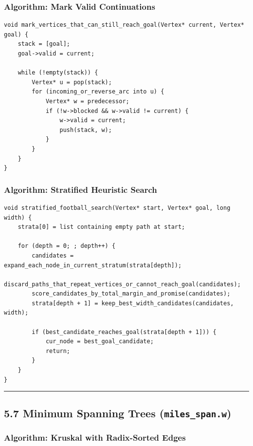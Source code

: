 \documentclass[11pt]{article}
\begin{document}
\subsubsection{Algorithm: Mark Valid Continuations}\label{algorithm-mark-valid-continuations}

\begin{verbatim}
void mark_vertices_that_can_still_reach_goal(Vertex* current, Vertex* goal) {
    stack = [goal];
    goal->valid = current;

    while (!empty(stack)) {
        Vertex* u = pop(stack);
        for (incoming_or_reverse_arc into u) {
            Vertex* w = predecessor;
            if (!w->blocked && w->valid != current) {
                w->valid = current;
                push(stack, w);
            }
        }
    }
}
\end{verbatim}

\subsubsection{Algorithm: Stratified Heuristic Search}\label{algorithm-stratified-heuristic-search}

\begin{verbatim}
void stratified_football_search(Vertex* start, Vertex* goal, long width) {
    strata[0] = list containing empty path at start;

    for (depth = 0; ; depth++) {
        candidates = expand_each_node_in_current_stratum(strata[depth]);
        discard_paths_that_repeat_vertices_or_cannot_reach_goal(candidates);
        score_candidates_by_total_margin_and_promise(candidates);
        strata[depth + 1] = keep_best_width_candidates(candidates, width);

        if (best_candidate_reaches_goal(strata[depth + 1])) {
            cur_node = best_goal_candidate;
            return;
        }
    }
}
\end{verbatim}

\begin{center}\rule{0.5\linewidth}{0.5pt}\end{center}

\subsection{\texorpdfstring{5.7 Minimum Spanning Trees (\texttt{miles\_span.w})}{5.7 Minimum Spanning Trees (miles\_span.w)}}\label{minimum-spanning-trees-miles_span.w}

\subsubsection{Algorithm: Kruskal with Radix-Sorted Edges}\label{algorithm-kruskal-with-radix-sorted-edges}
\end{document}
